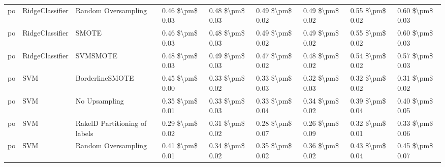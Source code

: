 \begin{tabular}{lllllllll}
      po &                 RidgeClassifier &           Random Oversampling & 0.46 \$\textbackslash pm\$ 0.03 &           0.48 \$\textbackslash pm\$ 0.03 &       0.49 \$\textbackslash pm\$ 0.02 &        0.49 \$\textbackslash pm\$ 0.02 &                         0.55 \$\textbackslash pm\$ 0.02 &     0.60 \$\textbackslash pm\$ 0.03 \\
      po &                 RidgeClassifier &                         SMOTE & 0.46 \$\textbackslash pm\$ 0.03 &           0.48 \$\textbackslash pm\$ 0.03 &       0.49 \$\textbackslash pm\$ 0.02 &        0.49 \$\textbackslash pm\$ 0.02 &                         0.55 \$\textbackslash pm\$ 0.02 &     0.60 \$\textbackslash pm\$ 0.03 \\
      po &                 RidgeClassifier &                      SVMSMOTE & 0.48 \$\textbackslash pm\$ 0.03 &           0.49 \$\textbackslash pm\$ 0.03 &       0.47 \$\textbackslash pm\$ 0.02 &        0.48 \$\textbackslash pm\$ 0.02 &                         0.54 \$\textbackslash pm\$ 0.02 &     0.57 \$\textbackslash pm\$ 0.03 \\
      po &                             SVM &               BorderlineSMOTE & 0.45 \$\textbackslash pm\$ 0.00 &           0.33 \$\textbackslash pm\$ 0.02 &       0.33 \$\textbackslash pm\$ 0.03 &        0.32 \$\textbackslash pm\$ 0.03 &                         0.32 \$\textbackslash pm\$ 0.02 &     0.31 \$\textbackslash pm\$ 0.02 \\
      po &                             SVM &                 No Upsampling & 0.35 \$\textbackslash pm\$ 0.01 &           0.33 \$\textbackslash pm\$ 0.03 &       0.33 \$\textbackslash pm\$ 0.04 &        0.34 \$\textbackslash pm\$ 0.02 &                         0.39 \$\textbackslash pm\$ 0.04 &     0.40 \$\textbackslash pm\$ 0.05 \\
      po &                             SVM & RakelD Partitioning of labels & 0.29 \$\textbackslash pm\$ 0.02 &           0.31 \$\textbackslash pm\$ 0.02 &       0.28 \$\textbackslash pm\$ 0.07 &        0.26 \$\textbackslash pm\$ 0.09 &                         0.32 \$\textbackslash pm\$ 0.01 &     0.33 \$\textbackslash pm\$ 0.06 \\
      po &                             SVM &           Random Oversampling & 0.41 \$\textbackslash pm\$ 0.01 &           0.34 \$\textbackslash pm\$ 0.02 &       0.35 \$\textbackslash pm\$ 0.02 &        0.36 \$\textbackslash pm\$ 0.02 &                         0.43 \$\textbackslash pm\$ 0.04 &     0.45 \$\textbackslash pm\$ 0.07 \\

\end{tabular}
